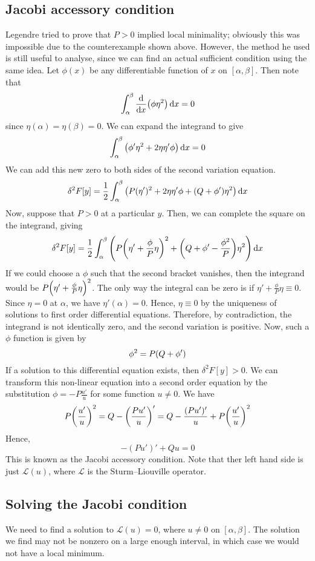 \subsection{Jacobi accessory condition}
Legendre tried to prove that \( P > 0 \) implied local minimality; obviously this was impossible due to the counterexample shown above.
However, the method he used is still useful to analyse, since we can find an actual sufficient condition using the same idea.
Let \( \phi(x) \) be any differentiable function of \( x \) on \( [\alpha, \beta] \).
Then note that
\[
	\int_\alpha^\beta \dv{x} \qty( \phi \eta^2 ) \dd{x} = 0
\]
since \( \eta(\alpha) = \eta(\beta) = 0 \).
We can expand the integrand to give
\[
	\int_\alpha^\beta \qty( \phi' \eta^2 + 2 \eta \eta' \phi ) \dd{x} = 0
\]
We can add this new zero to both sides of the second variation equation.
\[
	\delta^2 F[y] = \frac{1}{2} \int_\alpha^\beta \qty( P(\eta')^2 + 2 \eta \eta' \phi + \qty(Q + \phi') \eta^2 ) \dd{x}
\]
Now, suppose that \( P > 0 \) at a particular \( y \).
Then, we can complete the square on the integrand, giving
\[
	\delta^2 F[y] = \frac{1}{2} \int_\alpha^\beta \qty( P\qty(\eta' + \frac{\phi}{P} \eta)^2 + \qty(Q + \phi' - \frac{\phi^2}{P}) \eta^2 ) \dd{x}
\]
If we could choose a \( \phi \) such that the second bracket vanishes, then the integrand would be \( P\qty(\eta' + \frac{\phi}{P} \eta)^2 \).
The only way the integral can be zero is if \( \eta' + \frac{\phi}{P} \eta \equiv 0 \).
Since \( \eta = 0 \) at \( \alpha \), we have \( \eta'(\alpha) = 0 \).
Hence, \( \eta \equiv 0 \) by the uniqueness of solutions to first order differential equations.
Therefore, by contradiction, the integrand is not identically zero, and the second variation is positive.
Now, such a \( \phi \) function is given by
\[
	\phi^2 = P\qty(Q + \phi')
\]
If a solution to this differential equation exists, then \( \delta^2 F[y] > 0 \).
We can transform this non-linear equation into a second order equation by the substitution \( \phi = -P \frac{u'}{u} \) for some function \( u \neq 0 \).
We have
\[
	P \qty(\frac{u'}{u})^2 = Q - \qty(\frac{Pu'}{u})' = Q - \frac{(Pu')'}{u} + P \qty(\frac{u'}{u})^2
\]
Hence,
\[
	-(Pu')' + Qu = 0
\]
This is known as the Jacobi accessory condition.
Note that ther left hand side is just \( \mathcal L(u) \), where \( \mathcal L \) is the Sturm--Liouville operator.

\subsection{Solving the Jacobi condition}
We need to find a solution to \( \mathcal L(u) = 0 \), where \( u \neq 0 \) on \( [\alpha, \beta] \).
The solution we find may not be nonzero on a large enough interval, in which case we would not have a local minimum.

